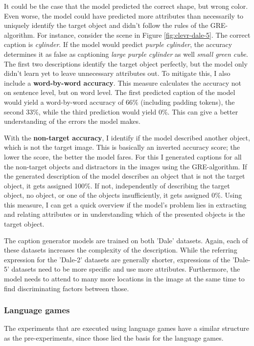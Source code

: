 It could be the case that the model predicted the correct shape, but wrong color.
Even worse, the model could have predicted more attributes than necessarily to uniquely identify the target object and didn't follow the rules of the GRE-algorithm.
For instance, consider the scene in Figure \ref{fig:clevr-dale-5}.
The correct caption is \emph{cylinder}.
If the model would predict \emph{purple cylinder}, the accuracy determines it as false as captioning \emph{large purple cylinder} as well \emph{small green cube}.
The first two descriptions identify the target object perfectly, but the model only didn't learn yet to leave unnecessary attributes out.
To mitigate this, I also include a \textbf{word-by-word accuracy}.
This measure calculates the accuracy not on sentence level, but on word level.
The first predicted caption of the model would yield a word-by-word accuracy of 66\% (including padding tokens), the second 33\%, while the third prediction would
yield 0\%.
This can give a better understanding of the errors the model makes.

With the \textbf{non-target accuracy}, I identify if the model described another object, which is not the target image.
This is basically an inverted accuracy score; the lower the score, the better the model fares.
For this I generated captions for all the non-target objects and distractors in the images using the GRE-algorithm.
If the generated description of the model describes an object that is not the target object, it gets assigned 100\%.
If not, independently of describing the target object, no object, or one of the objects insufficiently, it gets assigned 0\%.
Using this measure, I can get a quick overview if the model's problem lies in extracting and relating attributes or in understanding which of the presented objects is the target object.

The caption generator models are trained on both 'Dale' datasets.
Again, each of these datasets increases the complexity of the description.
While the referring expression for the 'Dale-2' datasets are generally shorter, expressions of the 'Dale-5' datasets need to be more specific and use more attributes.
Furthermore, the model needs to attend to many more locations in the image at the same time to find discriminating factors between those.


\subsubsection{Language games}
The experiments that are executed using language games have a similar structure as the pre-experiments, since those lied the basis for the language games.

